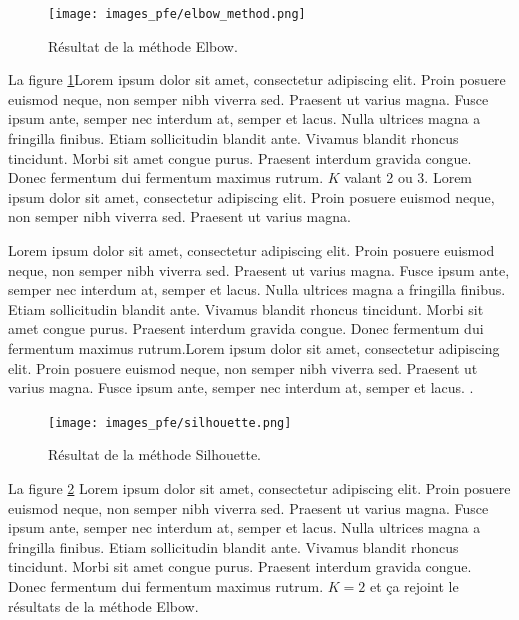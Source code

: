 \begin{figure}[hbt!]
  \centering
  \texttt{[image: images\_pfe/elbow\_method.png]}
  \caption{Résultat de la méthode Elbow.}
  \label{fig:elbow-method}
\end{figure}
\FloatBarrier

La figure \ref{fig:elbow-method}Lorem ipsum dolor sit amet, consectetur adipiscing elit. Proin posuere euismod neque, non semper nibh viverra sed. Praesent ut varius magna. Fusce ipsum ante, semper nec interdum at, semper et lacus. Nulla ultrices magna a fringilla finibus. Etiam sollicitudin blandit ante. Vivamus blandit rhoncus tincidunt. Morbi sit amet congue purus. Praesent interdum gravida congue. Donec fermentum dui fermentum maximus rutrum. $K$ valant 2 ou 3. Lorem ipsum dolor sit amet, consectetur adipiscing elit. Proin posuere euismod neque, non semper nibh viverra sed. Praesent ut varius magna.

\medskip

Lorem ipsum dolor sit amet, consectetur adipiscing elit. Proin posuere euismod neque, non semper nibh viverra sed. Praesent ut varius magna. Fusce ipsum ante, semper nec interdum at, semper et lacus. Nulla ultrices magna a fringilla finibus. Etiam sollicitudin blandit ante. Vivamus blandit rhoncus tincidunt. Morbi sit amet congue purus. Praesent interdum gravida congue. Donec fermentum dui fermentum maximus rutrum.Lorem ipsum dolor sit amet, consectetur adipiscing elit. Proin posuere euismod neque, non semper nibh viverra sed. Praesent ut varius magna. Fusce ipsum ante, semper nec interdum at, semper et lacus. \parencite{kassambara_determining_nodate}.

\begin{figure}[hbt!]
  \centering
  \texttt{[image: images\_pfe/silhouette.png]}
  \caption{Résultat de la méthode Silhouette.}
  \label{fig:silhouette-method}
\end{figure}
\FloatBarrier

La figure \ref{fig:silhouette-method} Lorem ipsum dolor sit amet, consectetur adipiscing elit. Proin posuere euismod neque, non semper nibh viverra sed. Praesent ut varius magna. Fusce ipsum ante, semper nec interdum at, semper et lacus. Nulla ultrices magna a fringilla finibus. Etiam sollicitudin blandit ante. Vivamus blandit rhoncus tincidunt. Morbi sit amet congue purus. Praesent interdum gravida congue. Donec fermentum dui fermentum maximus rutrum. $K = 2$ et ça rejoint le résultats de la méthode Elbow.

\medskip

